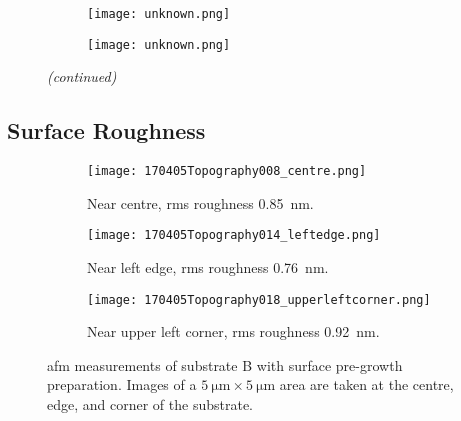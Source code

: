 \begin{figure}[htbp]
\ContinuedFloat
    \centering
    \begin{subfigure}[t]{\textwidth}
          \begin{minipage}[t]{0.49\linewidth}
            \centering
            \texttt{[image: unknown.png]}
          \end{minipage}
          \hspace{0.02\linewidth}
          \begin{minipage}[t]{0.49\linewidth}
            \centering
            \texttt{[image: unknown.png]}
          \end{minipage}
        \caption{}\label{fig:add_label}
    \end{subfigure}
    \captionsetup{list=no}
    \caption{\emph{(continued)}}
\end{figure}



\subsection{Surface Roughness}
\begin{figure}[htbp]
    \centering
    \begin{subfigure}[t]{\linewidth}
    \centering
        \texttt{[image: 170405Topography008\_centre.png]}
        \caption{Near centre, \ac{rms} roughness \SI{0.85}{\nano\metre}.}%
    \end{subfigure}%
    \par\bigskip
    \begin{subfigure}[t]{\linewidth}
    \centering
        \texttt{[image: 170405Topography014\_leftedge.png]}
        \caption{Near left edge, \ac{rms} roughness \SI{0.76}{\nano\metre}.}%
    \end{subfigure}%
    \par\bigskip
    \begin{subfigure}[t]{\linewidth}
    \centering
        \texttt{[image: 170405Topography018\_upperleftcorner.png]}
        \caption{Near upper left corner, \ac{rms} roughness \SI{0.92}{\nano\metre}.} %
    \end{subfigure}%
    \caption[\Ac{afm} of substrate B with surface pre-growth preparation.]{\Acf{afm} measurements of substrate B with surface pre-growth preparation. Images of a $\SI{5}{\micro\metre}\times\SI{5}{\micro\metre}$ area are taken at the centre, edge, and corner of the substrate.}\label{fig:afm_subBb}
\end{figure} %

